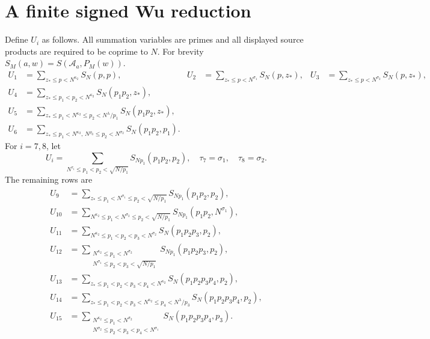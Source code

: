 \documentclass[11pt]{article}
\theoremstyle{definition}
\newcommand{\A}{\mathcal A}
\begin{document}
\section{A finite signed Wu reduction}\label{sec:wu}

Define $U_i$ as follows.  All summation variables are primes and all
displayed source products are required to be coprime to $N$.
For brevity $S_M(a,w)=S(\A_a,P_M(w))$.
\begin{align*}
 U_1&=\sum_{z_*\le p<N^{\kappa_2}}S_N(p,p),&
 U_2&=\sum_{z_*\le p<N^{\sigma_1}}S_N(p,z_*),&
 U_3&=\sum_{z_*\le p<N^{\sigma_2}}S_N(p,z_*),\\
 U_4&=\sum_{z_*\le p_1<p_2<N^{\kappa_2}}S_N(p_1p_2,z_*),\\
 U_5&=\sum_{z_*\le p_1<N^{\kappa_2}\le p_2<N^{\lambda}/p_1}
 S_N(p_1p_2,z_*),\\
 U_6&=\sum_{z_*\le p_1<N^{\kappa_2},\,N^{\rho_0}\le p_2<N^{\sigma_2}}
 S_N(p_1p_2,p_1).
\end{align*}
For $i=7,8$, let
\[
 U_i=\sum_{N^{\tau_i}\le p_1<p_2<\sqrt{N/p_1}}S_{Np_1}(p_1p_2,p_2),
 \quad\tau_7=\sigma_1,\quad\tau_8=\sigma_2.
\]
The remaining rows are
\begin{align*}
 U_9&=\sum_{z_*\le p_1<N^{\sigma_1}\le p_2<\sqrt{N/p_1}}
 S_{Np_1}(p_1p_2,p_2),\\
 U_{10}&=\sum_{N^{\kappa_2}\le p_1<N^{\sigma_2}\le p_2<\sqrt{N/p_1}}
 S_{Np_1}(p_1p_2,N^{\sigma_1}),\\
 U_{11}&=\sum_{N^{\kappa_2}\le p_1<p_2<p_3<N^{\sigma_2}}
 S_N(p_1p_2p_3,p_2),\\
 U_{12}&=\sum_{\substack{N^{\kappa_2}\le p_1<N^{\sigma_2}\\
 N^{\sigma_1}\le p_2<p_3<\sqrt{N/p_1}}}S_{Np_1}(p_1p_2p_3,p_2),\\
 U_{13}&=\sum_{z_*\le p_1<p_2<p_3<p_4<N^{\kappa_2}}
 S_N(p_1p_2p_3p_4,p_2),\\
 U_{14}&=\sum_{z_*\le p_1<p_2<p_3<N^{\kappa_2}\le p_4<N^{\lambda}/p_3}
 S_N(p_1p_2p_3p_4,p_2),\\
 U_{15}&=\sum_{\substack{N^{\kappa_2}\le p_1<N^{\sigma_2}\\
 N^{\sigma_2}\le p_2<p_3<p_4<N^{\sigma_1}}}S_N(p_1p_2p_3p_4,p_3).
\end{align*}
\end{document}
